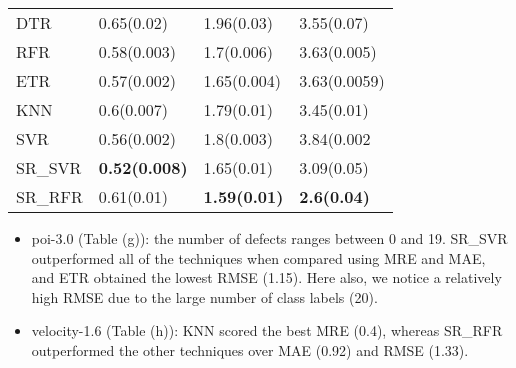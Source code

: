 \documentclass[]{article}
\begin{document}
\begin{table}[h]
\begin{adjustwidth}{-3.4cm}{}
\begin{subtable}{9cm}
\begin{tabular}{llll}
					DTR & 0.65(0.02) & 1.96(0.03) & 3.55(0.07)\\ 
					RFR & 0.58(0.003) & 1.7(0.006) & 3.63(0.005)\\
					ETR & 0.57(0.002) & 1.65(0.004) & 3.63(0.0059)\\ 
					KNN & 0.6(0.007) & 1.79(0.01) & 3.45(0.01)\\ 
					SVR & 0.56(0.002) & 1.8(0.003) & 3.84(0.002\\ 
					SR\_SVR & \bfseries 0.52(0.008) & 1.65(0.01) & 3.09(0.05)\\
					SR\_RFR & 0.61(0.01) & \bfseries 1.59(0.01) & \bfseries 2.6(0.04)\\ \hline
				\end{tabular}
			\end{subtable} 
		\end{adjustwidth}
	\end{table}
	\FloatBarrier
	\begin{itemize}
		\item poi-3.0 (Table (g)): the number of defects ranges between 0 and 19. SR\_SVR outperformed all of the techniques when compared using MRE and MAE, and ETR obtained the lowest RMSE (1.15). Here also, we notice a relatively high RMSE due to the large number of class labels (20).
		\item velocity-1.6 (Table (h)): KNN scored the best MRE (0.4), whereas SR\_RFR outperformed the other techniques over MAE (0.92) and RMSE (1.33).
	\end{itemize}
	\FloatBarrier
\end{document}
